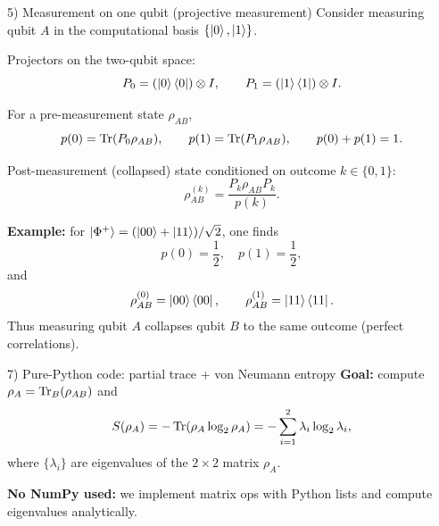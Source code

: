 \documentclass[aspectratio=169]{beamer}
\begin{document}
\begin{frame}{5) Measurement on one qubit (projective measurement)}
Consider measuring qubit $A$ in the computational basis $\{\ket{0},\ket{1}\}$.

\medskip
Projectors on the two-qubit space:
\[
P_0=(\ket{0}\bra{0})\otimes I,\qquad
P_1=(\ket{1}\bra{1})\otimes I.
\]

For a pre-measurement state $\rho_{AB}$,
\[
p(0)=\Tr(P_0\rho_{AB}),\qquad p(1)=\Tr(P_1\rho_{AB}), \qquad p(0)+p(1)=1.
\]

Post-measurement (collapsed) state conditioned on outcome $k\in\{0,1\}$:
\[
\rho_{AB}^{(k)}=\frac{P_k \rho_{AB} P_k}{p(k)}.
\]

\medskip
\textbf{Example:} for $\ket{\Phi^+}=(\ket{00}+\ket{11})/\sqrt{2}$, one finds
\[
p(0)=\frac{1}{2},\quad p(1)=\frac{1}{2},
\]
and
\[
\rho^{(0)}_{AB}=\ket{00}\bra{00},\qquad
\rho^{(1)}_{AB}=\ket{11}\bra{11}.
\]
Thus measuring qubit $A$ collapses qubit $B$ to the same outcome (perfect correlations).
\end{frame}

\begin{frame}{7) Pure-Python code: partial trace + von Neumann entropy}
\textbf{Goal:} compute $\rho_A=\Tr_B(\rho_{AB})$ and
\[
S(\rho_A)=-\Tr(\rho_A\log_2\rho_A)
= -\sum_{i=1}^{2}\lambda_i\log_2\lambda_i,
\]
where $\{\lambda_i\}$ are eigenvalues of the $2\times2$ matrix $\rho_A$.

\medskip
\textbf{No NumPy used:} we implement matrix ops with Python lists and compute eigenvalues analytically.
\end{frame}
\end{document}
